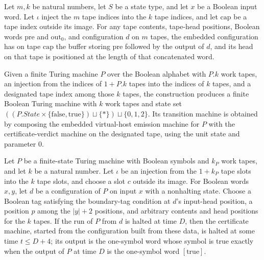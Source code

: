 \begin{theorem}
\label{Turing.cert_capture_fields}
\leanok
{}
Let $m,k$ be natural numbers, let $S$ be a state type, and let $x$ be a Boolean input
word. Let $\iota$ inject the $m$ tape indices into the $k$ tape indices, and let
$\mathrm{cap}$ be a tape index outside its image. For any tape contents, tape-head
positions, Boolean words $\mathrm{pre}$ and $\mathrm{out}_0$, and configuration $d$ on
$m$ tapes, the embedded configuration has on tape $\mathrm{cap}$ the buffer storing
$\mathrm{pre}$ followed by the output of $d$, and its head on that tape is positioned at
the length of that concatenated word.
\end{theorem}

\begin{definition}
\label{Turing.certCoreTM}
\leanok
{}
Given a finite Turing machine $P$ over the Boolean alphabet with $P.k$ work tapes, an
injection from the indices of $1+P.k$ tapes into the indices of $k$ tapes, and a
designated tape index among those $k$ tapes, the construction produces a finite Boolean
Turing machine with $k$ work tapes and state set
$((P.State\times\{\mathrm{false},\mathrm{true}\})\sqcup\{\ast\})\sqcup\{0,1,2\}$. Its
transition machine is obtained by composing the embedded virtual-host emission machine
for $P$ with the certificate-verdict machine on the designated tape, using the unit
state and parameter $0$.
\end{definition}

\begin{theorem}
\label{Turing.certCore_run}
\leanok
{}
Let $P$ be a finite-state Turing machine with Boolean symbols and $k_P$ work tapes, and
let $k$ be a natural number. Let $\iota$ be an injection from the $1+k_P$ tape slots
into the $k$ tape slots, and choose a slot $c$ outside its image. For Boolean words
$x,y$, let $d$ be a configuration of $P$ on input $x$ with a nonhalting state. Choose a
Boolean tag satisfying the boundary-tag condition at $d$’s input-head position, a
position $p$ among the $|y|+2$ positions, and arbitrary contents and head positions for
the $k$ tapes. If the run of $P$ from $d$ is halted at time $D$, then the certificate
machine, started from the configuration built from these data, is halted at some time
$t\le D+4$; its output is the one-symbol word whose symbol is true exactly when the
output of $P$ at time $D$ is the one-symbol word $[\mathrm{true}]$.
\end{theorem}

